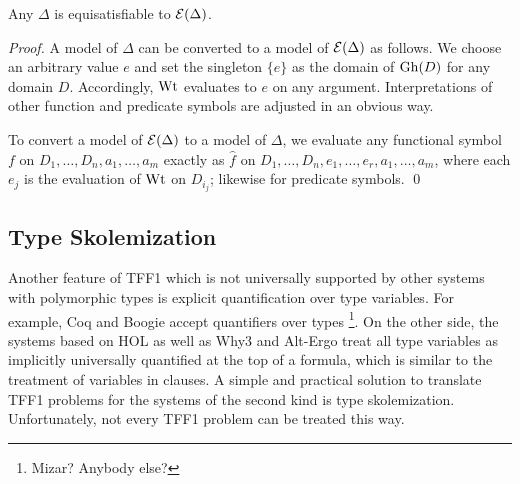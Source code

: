 \begin{theorem} \label{thm:eli}
Any $\Delta$ is equisatisfiable to $\mathcal{E}(\Delta)$.
\end{theorem}
\begin{proof}
A model of $\Delta$ can be converted to a model of $\mathcal{E}(\Delta)$
as follows. We choose an arbitrary value $e$ and set the singleton
$\{ e \}$ as the domain of $\mathrm{Gh}(D)$ for any domain $D$.
Accordingly, $\mathrm{Wt}$ evaluates to $e$ on any argument.
Interpretations of other function and predicate symbols are
adjusted in an obvious way.

To convert a model of $\mathcal{E}(\Delta)$
to a model of $\Delta$, we evaluate any functional symbol
$f$ on $D_1,\dots,D_n,a_1,\dots,a_m$ exactly as
$\hat{f}$ on $D_1,\dots,D_n,e_1,\dots,e_r,a_1,\dots,a_m$,
where each $e_j$ is the evaluation of $\mathrm{Wt}$ on $D_{i_j}$;
likewise for predicate symbols.
\qed
\end{proof}

\subsection{Type Skolemization} \label{ssec:skol}

Another feature of TFF1 which is not universally supported
by other systems with polymorphic types is explicit
quantification over type variables.
For example, Coq and Boogie accept quantifiers over types%
\footnote{Mizar? Anybody else?}.
On the other side, the systems based on HOL as well as Why3 and
Alt-Ergo treat all type variables as implicitly universally
quantified at the top of a formula, which is similar to
the treatment of variables in clauses.
A simple and practical solution to translate TFF1 problems
for the systems of the second kind is type skolemization.
Unfortunately, not every TFF1 problem can be treated this way.

